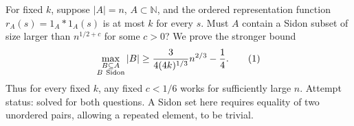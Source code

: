 For fixed \(k\), suppose \(|A|=n\), \(A\subset\mathbb N\), and the ordered representation function \(r_A(s)=1_A*1_A(s)\) is at most \(k\) for every \(s\). Must \(A\) contain a Sidon subset of size larger than \(n^{1/2+c}\) for some \(c>0\)?
We prove the stronger bound
\[
\max_{\substack{B\subseteq A\\B\ {\rm Sidon}}}|B|
\geq \frac{3}{4(4k)^{1/3}}n^{2/3}-\frac14. \tag{1}
\]
Thus for every fixed \(k\), any fixed \(c<1/6\) works for sufficiently large \(n\). Attempt status: solved for both questions. A Sidon set here requires equality of two unordered pairs, allowing a repeated element, to be trivial.
